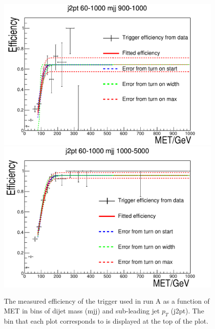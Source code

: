 \begin{figure}[h!]
\begin{center}
    \includegraphics[width=.6\largefigwidth]{plots/parked/trigfitplots/hData_MET_1D_44A.pdf}
    \includegraphics[width=.6\largefigwidth]{plots/parked/trigfitplots/hData_MET_1D_45A.pdf}
    \caption{The measured efficiency of the trigger used in run A as a function of MET in bins of dijet mass (mjj) and sub-leading jet $p_{T}$ (j2pt). The bin that each plot corresponds to is displayed at the top of the plot.}
    \label{fig:trigfitplotsA2}
  \end{center}
\end{figure}

